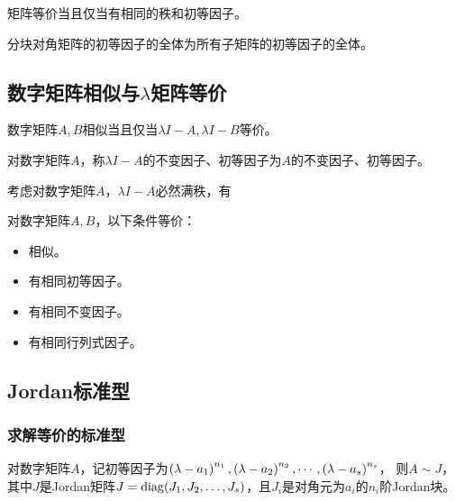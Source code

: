 \begin{corollary}
    矩阵等价当且仅当有相同的秩和初等因子。
\end{corollary}

\begin{theorem}
    分块对角矩阵的初等因子的全体为所有子矩阵的初等因子的全体。
\end{theorem}

\subsection{数字矩阵相似与$\lambda$矩阵等价}
\begin{theorem}
    数字矩阵$A,B$相似当且仅当$\lambda I-A,\lambda I-B$等价。
\end{theorem}

\begin{definition}
    对数字矩阵$A$，称$\lambda I - A$的不变因子、初等因子为$A$的不变因子、初等因子。
\end{definition}

考虑对数字矩阵$A$，$\lambda I-A$必然满秩，有
\begin{definition}
    对数字矩阵$A,B$，以下条件等价：
    \begin{itemize}
        \item 相似。
        \item 有相同初等因子。
        \item 有相同不变因子。
        \item 有相同行列式因子。
    \end{itemize}
\end{definition}

\subsection{Jordan标准型}

\subsubsection{求解等价的标准型}

\begin{theorem}
    对数字矩阵$A$，记初等因子为$\left(\lambda-a_{1}\right)^{n_{1}},\linebreak[1]\left(\lambda-a_{2}\right)^{n_{2}},\cdots,\left(\lambda-a_{s}\right)^{n_{s}}$，
    则$A\sim J$，其中$J$是Jordan矩阵$J=\operatorname{diag}(J_1,J_2,\dots,J_s)$，且$J_i$是对角元为$a_i$的$n_i$阶Jordan块。
\end{theorem}

